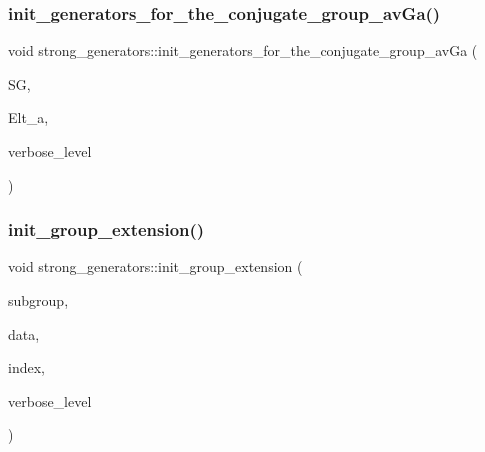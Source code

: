 \mbox{\label{classstrong__generators_afc51616fda5a1814d0671585a28cd718}} 
\subsubsection{\texorpdfstring{init\+\_\+generators\+\_\+for\+\_\+the\+\_\+conjugate\+\_\+group\+\_\+av\+Ga()}{init\_generators\_for\_the\_conjugate\_group\_avGa()}}
{\footnotesize\ttfamily void strong\+\_\+generators\+::init\+\_\+generators\+\_\+for\+\_\+the\+\_\+conjugate\+\_\+group\+\_\+av\+Ga (\begin{DoxyParamCaption}\item[{\mbox{\hyperlink{classstrong__generators}{strong\+\_\+generators}} $\ast$}]{SG,  }\item[{\mbox{\hyperlink{galois_8h_a09fddde158a3a20bd2dcadb609de11dc}{I\+NT}} $\ast$}]{Elt\+\_\+a,  }\item[{\mbox{\hyperlink{galois_8h_a09fddde158a3a20bd2dcadb609de11dc}{I\+NT}}}]{verbose\+\_\+level }\end{DoxyParamCaption})}

\mbox{\label{classstrong__generators_a5e889497cab5e9c522c8c4610ebb8328}} 
\subsubsection{\texorpdfstring{init\+\_\+group\+\_\+extension()}{init\_group\_extension()}\hspace{0.1cm}{\footnotesize\ttfamily [1/2]}}
{\footnotesize\ttfamily void strong\+\_\+generators\+::init\+\_\+group\+\_\+extension (\begin{DoxyParamCaption}\item[{\mbox{\hyperlink{classstrong__generators}{strong\+\_\+generators}} $\ast$}]{subgroup,  }\item[{\mbox{\hyperlink{galois_8h_a09fddde158a3a20bd2dcadb609de11dc}{I\+NT}} $\ast$}]{data,  }\item[{\mbox{\hyperlink{galois_8h_a09fddde158a3a20bd2dcadb609de11dc}{I\+NT}}}]{index,  }\item[{\mbox{\hyperlink{galois_8h_a09fddde158a3a20bd2dcadb609de11dc}{I\+NT}}}]{verbose\+\_\+level }\end{DoxyParamCaption})}

